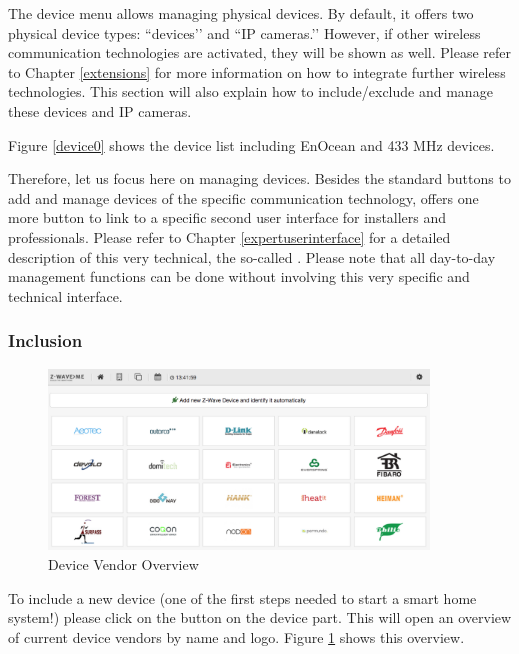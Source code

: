 The device menu allows managing physical devices. By default, it offers two physical 
device types: ``\zwave devices’’ and ``IP cameras.’’ However, if other wireless communication 
technologies are activated, they will be shown as well. Please refer to 
Chapter \ref{extensions} for more information on how to integrate further 
wireless technologies.   This section will also explain how to include/exclude and manage 
these devices and IP cameras.

Figure \ref{device0} shows the device list including EnOcean and 433 MHz devices.

Therefore, let us focus here on managing \zwave devices. Besides the standard buttons 
to add and manage devices of the specific communication technology, \zwave offers one
 more button to link to a specific second \zwave user interface for installers and professionals.
Please refer to Chapter \ref{expertuserinterface} for a detailed description of this very 
technical, the so-called \zweui. Please note that all day-to-day management functions 
can be done without involving this very specific and technical interface.

\subsubsection{Inclusion}
\label{inclusion}

\begin{figure}
\begin{center}
\includegraphics[width=0.9\textwidth]{pngs/cap4/device1.png}
\caption{\zwave Device Vendor Overview}
\label{device1}
\end{center}
\end{figure}

To include a new \zwave device (one of the first steps needed to start a smart home 
system!) please click on the \keystroke{+} button on the \zwave device part. This will open an 
overview of current \zwave device vendors by name and logo. Figure \ref{device1} 
shows this overview.

